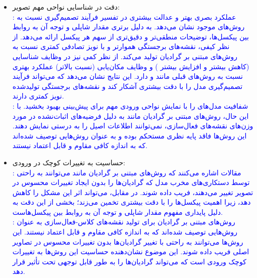 \documentclass[12pt]{article}
\begin{document}
\begin{enumerate}
\begin{enumerate}
\begin{itemize}
             \item دقت در شناسایی نواحی مهم تصویر:\\
             \textcolor{blue}{
             : عملکرد بصری بهتر و عدالت بیشتری در تفسیر فرآیند تصمیم‌گیری نسبت به روش‌های موجود نشان می‌دهد. به دلیل برتری مقدار شاپلی و توجه آن به روابط بین پیکسل‌ها،  توضیحات منطقی‌تر و دقیق‌تری از سهم هر پیکسل ارائه می‌دهد. از نظر کیفی،  نقشه‌های برجستگی هموارتر و با نویز تصادفی کمتری نسبت به روش‌های مبتنی بر گرادیان تولید می‌کند. از نظر کمی نیز در وظایف شناسایی (کاهش بیشتر  و افزایش بیشتر ) و وظایف مکان‌یابی (نسبت بالاتر) عملکرد بهتری نسبت به روش‌های قبلی مانند  و  دارد. این نتایج نشان می‌دهد که  می‌تواند فرآیند تصمیم‌گیری مدل را با دقت بیشتری آشکار کند و نقشه‌های برجستگی تولیدشده نویز کمتری دارند.}\\
             \textcolor{blue}{
            : شفافیت مدل‌های  را با نمایش نواحی ورودی مهم برای پیش‌بینی بهبود بخشید. با این حال، روش‌های مبتنی بر گرادیان مانند  به دلیل فرضیه‌های اثبات‌نشده در مورد وزن‌های نقشه‌های فعال‌سازی، نمی‌توانند اطلاعات اصیل را به درستی نمایش دهند. این روش‌ها فاقد پایه نظری مستحکم بوده و به عنوان روش‌هایی توصیف شده‌اند که به اندازه کافی مقاوم و قابل اعتماد نیستند.
             }
             \item حساسیت به تغییرات کوچک در ورودی:\\
             \textcolor{blue}{
             : مقالات اشاره می‌کنند که روش‌های مبتنی بر گرادیان مانند  می‌توانند به راحتی توسط دستکاری‌های مخرب مدل که گرادیان‌ها را بدون ایجاد تغییرات محسوس در تصویر تغییر می‌دهند، فریب داده شوند. در مقابل،  می‌تواند اثر این مشکل را کاهش دهد، زیرا اهمیت پیکسل‌ها را با دقت بیشتری تخمین می‌زند؛ بخشی از این دقت به دلیل پایداری مفهوم مقدار شاپلی و توجه آن به روابط بین پیکسل‌هاست.}\\
             \textcolor{blue}{
             : روش‌های مبتنی بر گرادیان برای تولید نقشه‌های کلاس-فعال‌سازی به عنوان روش‌هایی توصیف شده‌اند که به اندازه کافی مقاوم و قابل اعتماد نیستند. این روش‌ها می‌توانند به راحتی با تغییر گرادیان‌ها بدون تغییرات محسوس در تصاویر اصلی فریب داده شوند. این موضوع نشان‌دهنده حساسیت این روش‌ها به تغییرات کوچک ورودی است که می‌تواند گرادیان‌ها را به طور قابل توجهی تحت تأثیر قرار دهد.
             }
         \end{itemize}

\end{enumerate}
\end{enumerate}
\end{document}
